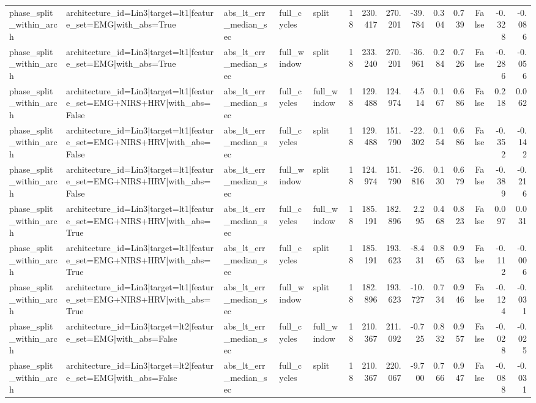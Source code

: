\begin{table}
\begin{tabular}{lllllrrrrrrrrr}
phase_split_within_arch & architecture_id=Lin3|target=lt1|feature_set=EMG|with_abs=True & abs_lt_err_median_sec & full_cycles & split & 18 & 230.417 & 270.201 & -39.784 & 0.304 & 0.739 & False & -0.328 & -0.086 \\
phase_split_within_arch & architecture_id=Lin3|target=lt1|feature_set=EMG|with_abs=True & abs_lt_err_median_sec & full_window & split & 18 & 233.240 & 270.201 & -36.961 & 0.284 & 0.726 & False & -0.286 & -0.056 \\
phase_split_within_arch & architecture_id=Lin3|target=lt1|feature_set=EMG+NIRS+HRV|with_abs=False & abs_lt_err_median_sec & full_cycles & full_window & 18 & 129.488 & 124.974 & 4.514 & 0.167 & 0.686 & False & 0.218 & 0.062 \\
phase_split_within_arch & architecture_id=Lin3|target=lt1|feature_set=EMG+NIRS+HRV|with_abs=False & abs_lt_err_median_sec & full_cycles & split & 18 & 129.488 & 151.790 & -22.302 & 0.154 & 0.686 & False & -0.352 & -0.142 \\
phase_split_within_arch & architecture_id=Lin3|target=lt1|feature_set=EMG+NIRS+HRV|with_abs=False & abs_lt_err_median_sec & full_window & split & 18 & 124.974 & 151.790 & -26.816 & 0.130 & 0.679 & False & -0.389 & -0.216 \\
phase_split_within_arch & architecture_id=Lin3|target=lt1|feature_set=EMG+NIRS+HRV|with_abs=True & abs_lt_err_median_sec & full_cycles & full_window & 18 & 185.191 & 182.896 & 2.295 & 0.468 & 0.823 & False & 0.097 & 0.031 \\
phase_split_within_arch & architecture_id=Lin3|target=lt1|feature_set=EMG+NIRS+HRV|with_abs=True & abs_lt_err_median_sec & full_cycles & split & 18 & 185.191 & 193.623 & -8.431 & 0.865 & 0.963 & False & -0.112 & -0.006 \\
phase_split_within_arch & architecture_id=Lin3|target=lt1|feature_set=EMG+NIRS+HRV|with_abs=True & abs_lt_err_median_sec & full_window & split & 18 & 182.896 & 193.623 & -10.727 & 0.734 & 0.946 & False & -0.124 & -0.031 \\
phase_split_within_arch & architecture_id=Lin3|target=lt2|feature_set=EMG|with_abs=False & abs_lt_err_median_sec & full_cycles & full_window & 18 & 210.367 & 211.092 & -0.725 & 0.832 & 0.957 & False & -0.028 & -0.025 \\
phase_split_within_arch & architecture_id=Lin3|target=lt2|feature_set=EMG|with_abs=False & abs_lt_err_median_sec & full_cycles & split & 18 & 210.367 & 220.067 & -9.700 & 0.766 & 0.947 & False & -0.088 & -0.031 \\

\end{tabular}
\end{table}
